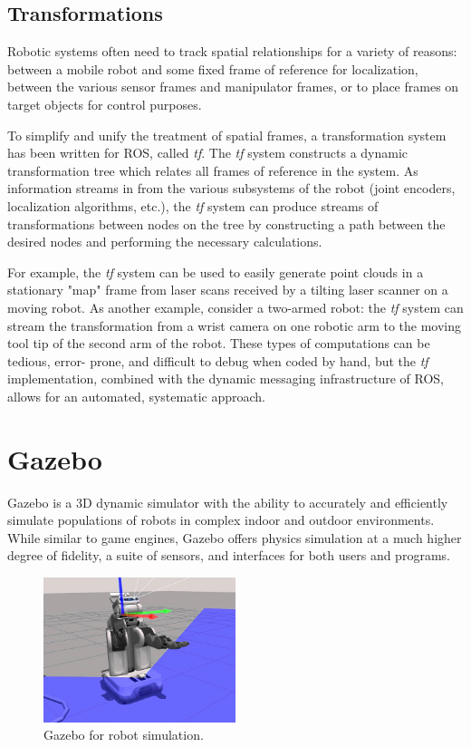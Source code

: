 \subsection{Transformations}

Robotic systems often need to track spatial relationships for a variety of reasons: between a mobile robot and some fixed frame of reference for localization, between the various sensor frames and manipulator frames, or to place frames on target objects for control purposes.

To simplify and unify the treatment of spatial frames, a transformation system has been written for ROS, called \textit{tf}. The \textit{tf} system constructs a dynamic transformation tree which relates all frames of reference in the system. As information streams in from the various subsystems of the robot (joint encoders, localization algorithms, etc.), the \textit{tf} system can produce streams of transformations between nodes on the tree by constructing a path between the desired nodes and performing the necessary calculations.

For example, the \textit{tf} system can be used to easily generate point clouds in a stationary "map" frame from laser scans received by a tilting laser scanner on a moving robot. As another example, consider a two-armed robot: the \textit{tf} system can stream the transformation from a wrist camera on one robotic arm to the moving tool tip of the second arm of the robot. These types of computations can be tedious, error- prone, and difficult to debug when coded by hand, but the \textit{tf} implementation, combined with the dynamic messaging infrastructure of ROS, allows for an automated, systematic approach.

\section{Gazebo}

Gazebo is a 3D dynamic simulator with the ability to accurately and efficiently simulate populations of robots in complex indoor and outdoor environments. While similar to game engines, Gazebo offers physics simulation at a much higher degree of fidelity, a suite of sensors, and interfaces for both users and programs.

\begin{figure}[h]
\centering
\includegraphics[width=0.5\textwidth]{figs/ch2/osrf.jpeg}
\caption{Gazebo for robot simulation.}
\end{figure}

